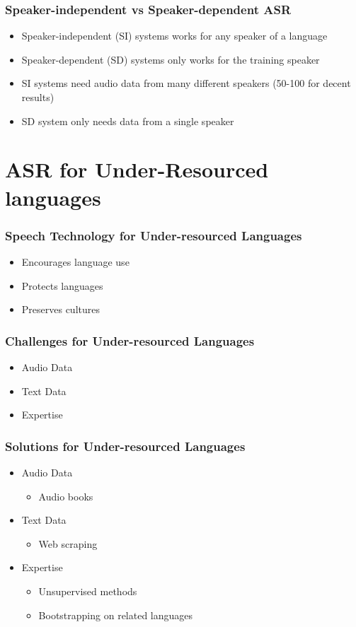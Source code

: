 \begin{frame}
\frametitle{Speaker-independent vs Speaker-dependent ASR}
\begin{itemize}
\item Speaker-independent (SI) systems works for any speaker of a language
\item Speaker-dependent (SD) systems  only works for the training speaker
\item SI systems need audio data from many different speakers (50-100 for decent results)
\item SD system only needs data from a single speaker
\end{itemize}
\end{frame}


\section[Under-resourced]{ASR for Under-Resourced languages}
\begin{frame}
\frametitle{Speech Technology for Under-resourced Languages}
\begin{itemize}
\item Encourages language use
\item Protects languages
\item Preserves cultures
\end{itemize}
\end{frame}

\begin{frame}
\frametitle{Challenges for Under-resourced Languages}
\begin{itemize}
\item Audio Data
\item Text Data
\item Expertise
\end{itemize}
\end{frame}
%

\begin{frame}
\frametitle{Solutions for Under-resourced Languages}
\begin{itemize}
\item Audio Data
\begin{itemize}
\item Audio books
\end{itemize}
\item Text Data
\begin{itemize}
\item Web scraping
\end{itemize}
\item Expertise
\begin{itemize}
\item Unsupervised methods
\item Bootstrapping on related languages
\end{itemize}
\end{itemize}
\end{frame}


